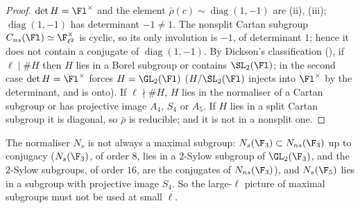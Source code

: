 \begin{proof}
$\det H=\Fl^\times$ and the element $\bar\rho(c)\sim\operatorname{diag}(1,-1)$ are (ii), (iii); $\operatorname{diag}(1,-1)$ has determinant $-1\ne1$. The
nonsplit Cartan subgroup $C_{ns}(\Fl)\simeq\F_{\ell^2}^\times$ is cyclic, so its only involution is $-1$, of determinant $1$; hence it does not contain a conjugate
of $\operatorname{diag}(1,-1)$. By Dickson's classification (), if $\ell\mid\#H$ then $H$ lies in a Borel subgroup or contains $\SL_2(\Fl)$; in the
second case $\det H=\Fl^\times$ forces $H=\GL_2(\Fl)$ ($H/\SL_2(\Fl)$ injects into $\Fl^\times$ by the determinant, and is onto). If $\ell\nmid\#H$, $H$ lies in the
normaliser of a Cartan subgroup or has projective image $A_4$, $S_4$ or $A_5$. If $H$ lies in a split Cartan subgroup it is diagonal, so $\bar\rho$ is
reducible; and it is not in a nonsplit one.
\end{proof}

The normaliser $N_s$ is not always a maximal subgroup: $N_s(\F_3)\subset N_{ns}(\F_3)$ up to conjugacy ($N_s(\F_3)$, of order $8$, lies in a $2$-Sylow
subgroup of $\GL_2(\F_3)$, and the $2$-Sylow subgroups, of order $16$, are the conjugates of $N_{ns}(\F_3)$), and $N_s(\F_5)$ lies in a subgroup with projective image
$S_4$. So the large-$\ell$ picture of maximal subgroups must not be used at small $\ell$.

